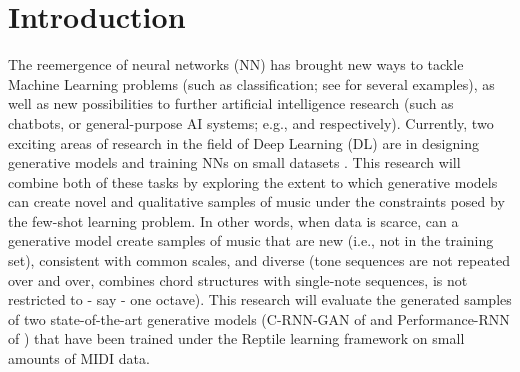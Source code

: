 
 



\chapter{Introduction}

The reemergence of neural networks (NN) has brought new ways to tackle Machine Learning problems (such as classification; see \cite{lecun_deep_2015} for several examples), as well as new possibilities to further artificial intelligence research (such as chatbots, or general-purpose AI systems; e.g., \cite{dale_return_2016} and \cite{vinyals_starcraft_2017} respectively). Currently, two exciting areas of research in the field of Deep Learning (DL) are in designing generative models \parencite{goodfellow_nips_2016} and training NNs on small datasets \parencite{finn_model-agnostic_2017, nichol_first-order_2018}. This research will combine both of these tasks by exploring the extent to which generative models can create novel and qualitative samples of music under the constraints posed by the few-shot learning problem. In other words, when data is scarce, can a generative model create samples of music that are new (i.e., not in the training set), consistent with common scales, and diverse (tone sequences are not repeated over and over, combines chord structures with single-note sequences, is not restricted to - say - one octave). This research will evaluate the generated samples of two state-of-the-art generative models (C-RNN-GAN of \cite{mogren_c-rnn-gan_2016} and Performance-RNN of \cite{oore_this_2018}) that have been trained under the Reptile learning framework \parencite{nichol_first-order_2018} on small amounts of MIDI data.

